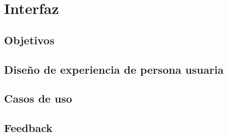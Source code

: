 \documentclass[a4paper,11pt]{memoir}
\begin{document}
\section{Interfaz}

\subsection{Objetivos}


\subsection{Diseño de experiencia de persona usuaria}


\subsection{Casos de uso}



\subsection{Feedback}

\end{document}

